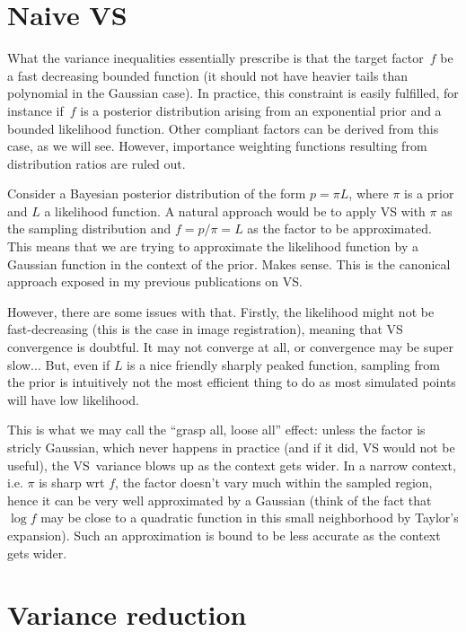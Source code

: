 \documentclass{article}
\begin{document}
\section{Naive VS}

What the variance inequalities essentially prescribe is that the target factor~$f$ be a fast decreasing bounded function (it should not have heavier tails than polynomial in the Gaussian case). In practice, this constraint is easily fulfilled, for instance if~$f$ is a posterior distribution arising from an exponential prior and a bounded likelihood function. Other compliant factors can be derived from this case, as we will see. However, importance weighting functions resulting from distribution ratios are ruled out.

Consider a Bayesian posterior distribution of the form $p=\pi L$, where $\pi$ is a prior and $L$ a likelihood function. A natural approach would be to apply VS with $\pi$ as the sampling distribution and $f=p/\pi=L$ as the factor to be approximated. This means that we are trying to approximate the likelihood function by a Gaussian function in the context of the prior. Makes sense. This is the canonical approach exposed in my previous publications on VS.

However, there are some issues with that. Firstly, the likelihood might not be fast-decreasing (this is the case in image registration), meaning that VS convergence is doubtful. It may not converge at all, or convergence may be super slow... But, even if $L$ is a nice friendly sharply peaked function, sampling from the prior is intuitively not the most efficient thing to do as most simulated points will have low likelihood.

This is what we may call the ``grasp all, loose all'' effect: unless the factor is stricly Gaussian, which never happens in practice (and if it did, VS would not be useful), the VS~variance blows up as the context gets wider. In a narrow context, i.e. $\pi$ is sharp wrt $f$, the factor doesn't vary much within the sampled region, hence it can be very well approximated by a Gaussian (think of the fact that $\log f$ may be close to a quadratic function in this small neighborhood by Taylor's expansion). Such an approximation is bound to be less accurate as the context gets wider. 


\section{Variance reduction}
\end{document}
